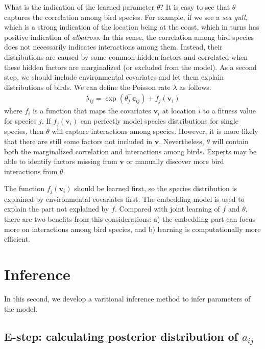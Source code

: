 \documentclass{article}
\begin{document}
What is the indication of the learned parameter $\theta$? It is easy to see that $\theta$ captures the correlation among bird species. For example, if we see a {\it sea gull}, which is a strong indication of the location being at the coast, which in turns has positive indication of {\it albatross}. In this sense, the correlation among bird species does not necessarily indicates interactions among them. Instead, their distributions are caused by some common hidden factors and correlated when these hidden factors are marginalized (or excluded from the model). As a second step, we should include environmental covariates and let them explain distributions of birds. We can define the Poisson rate $\lambda$ as follows. 
\begin{eqnarray}
\lambda_{ij} =  \exp(\theta_{j}^\top \mathbf{c}_{ij} ) + f_j (\mathbf{v}_i)
\end{eqnarray}
where $f_i$ is a function that maps the covariates $\mathbf{v}_i$ at location $i$ to a fitness value for species $j$. If $f_j (\mathbf{v}_i)$ can perfectly model species distributions for single species, then $\theta$ will capture interactions among species. However, it is more likely that there are still some factors not included in $\mathbf{v}$. Nevertheless, $\theta$ will contain both the marginalized correlation and interactions among birds. Experts may be able to identify factors missing from $\mathbf{v}$ or manually discover more bird interactions from $\theta$.  

The function $f_j (\mathbf{v}_i)$ should be learned first, so the species distribution is explained by environmental covariates first. The embedding model is used to explain the part not explained by $f$. Compared with joint learning of $f$ and $\theta$, there are two benefits from this considerations: a) the embedding part can focus more on interactions among bird species, and b) learning is computationally more efficient. 


\section{Inference}

In this second, we develop a varitional inference method to infer parameters of the model. 

\subsection{ E-step: calculating posterior distribution of $a_{ij}$}
\end{document}
